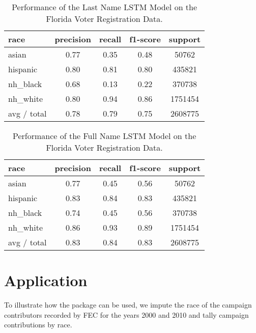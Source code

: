 \documentclass[12pt, letterpaper]{article}
\begin{document}
\begin{table}[h!]
\centering
\begin{tabular}{ l c c c c }
 \hline	
      race & precision & recall & f1-score & support \\
\hline
      asian & 0.77 & 0.35 & 0.48 & 50762 \\
   hispanic &  0.80 & 0.81 & 0.80 & 435821 \\
   nh\_black & 0.68 & 0.13 & 0.22 & 370738 \\
   nh\_white & 0.80 & 0.94 & 0.86 & 1751454 \\
\hline
avg / total     &    0.78 & 0.79  &  0.75 & 2608775 \\
\hline
\end{tabular}
\caption{Performance of the Last Name LSTM Model on the Florida Voter Registration Data.}
\label{table:2}
\end{table}

\begin{table}[h!]
\centering
\begin{tabular}{ l c c c c }
 \hline	
       race & precision & recall & f1-score & support\\
\hline
      asian & 0.77  & 0.45 & 0.56   &    50762\\
   hispanic  &  0.83 & 0.84 & 0.83  &    435821\\
   nh\_black &  0.74 &  0.45 & 0.56  &    370738\\
   nh\_white  & 0.86  & 0.93 & 0.89  &   1751454\\

avg / total     &    0.83    &    0.84    &    0.83  &   2608775\\
\hline
\end{tabular}
\caption{Performance of the Full Name LSTM Model on the Florida Voter Registration Data.}
\label{table:3}
\end{table}

\section*{Application}
To illustrate how the package can be used, we impute the race of the campaign contributors recorded by FEC for the years 2000 and 2010 and tally campaign contributions by race.

\clearpage


\end{document}

